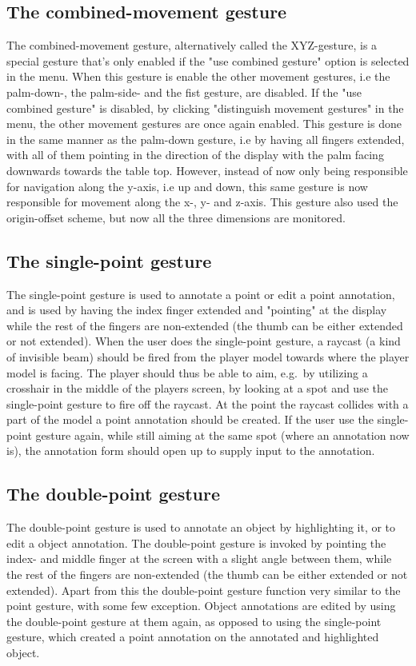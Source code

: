 \subsection{The combined-movement gesture}
The combined-movement gesture, alternatively called the XYZ-gesture, is a special gesture that's only enabled if the "use combined gesture" option is selected in the menu.
When this gesture is enable the other movement gestures, i.e the palm-down-, the palm-side- and the fist gesture, are disabled. If the "use combined gesture" is disabled, 
by clicking "distinguish movement gestures" in the menu, the other movement gestures are once again enabled. This gesture is done in the same manner as the palm-down gesture, 
i.e by having all fingers extended, with all of them pointing in the direction of the display with the palm facing downwards towards the table top.
However, instead of now only being responsible for navigation along the y-axis, i.e up and down, this same gesture is now responsible for movement along the x-, y- and z-axis.
This gesture also used the origin-offset scheme, but now all the three dimensions are monitored. 

\subsection{The single-point gesture}
The single-point gesture is used to annotate a point or edit a point annotation, and is used by having the index finger extended and "pointing" at the display while the 
rest of the fingers are non-extended (the thumb can be either extended or not extended). 
When the user does the single-point gesture, a raycast (a kind of invisible beam) should be fired from the player model towards where the player model is facing.
The player should thus be able to aim, e.g.~by utilizing a crosshair in the middle of the players screen, by looking at a spot and use the single-point gesture to fire off 
the raycast. At the point the raycast collides with a part of the model a point annotation should be created. If the user use the single-point gesture again, while
still aiming at the same spot (where an annotation now is), the annotation form should open up to supply input to the annotation. 

\subsection{The double-point gesture}
The double-point gesture is used to annotate an object by highlighting it, or to edit a object annotation. The double-point gesture is invoked by pointing the index- and
middle finger at the screen with a slight angle between them, while the rest of the fingers are non-extended (the thumb can be either extended or not extended).
Apart from this the double-point gesture function very similar to the point gesture, with some few exception. Object annotations are edited by using the 
double-point gesture at them again, as opposed to using the single-point gesture, which created a point annotation on the annotated and highlighted object.

